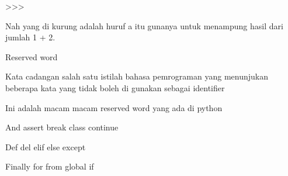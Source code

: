 \documentclass[a4paper,12pt]{report}
\begin{document}
\vspace{14pt}
\noindent 
{\fontsize{14pt}{14pt}\selectfont >>> \\} \par
\noindent 
{\fontsize{14pt}{14pt}\selectfont Nah yang di kurung adalah huruf a itu gunanya untuk menampung hasil dari jumlah 1 + 2.  \\} \par
\vspace{14pt}
\noindent 
{\fontsize{14pt}{14pt}\selectfont Reserved word  \\} \par
\vspace{14pt}
\noindent 
{\fontsize{14pt}{14pt}\selectfont Kata cadangan salah satu istilah bahasa pemrograman yang menunjukan beberapa kata yang tidak boleh di gunakan sebagai identifier \\} \par
\vspace{14pt}
\noindent 
{\fontsize{14pt}{14pt}\selectfont Ini adalah macam macam reserved word yang ada di python \\} \par
\vspace{14pt}
\noindent 
{\fontsize{14pt}{14pt}\selectfont And  \hspace*{0.5in}  \hspace*{0.5in} assert \hspace*{0.5in}  \hspace*{0.5in} break \hspace*{0.5in}  \hspace*{0.5in} class \hspace*{0.5in}  \hspace*{0.5in} continue \\} \par
\vspace{14pt}
\noindent 
{\fontsize{14pt}{14pt}\selectfont Def \hspace*{0.5in}  \hspace*{0.5in} del \hspace*{0.5in}  \hspace*{0.5in} elif \hspace*{0.5in}  \hspace*{0.5in} else \hspace*{0.5in}  \hspace*{0.5in} except \\} \par
\noindent 
{\fontsize{14pt}{14pt}\selectfont Finally \hspace*{0.5in} for \hspace*{0.5in}  \hspace*{0.5in} from  \hspace*{0.5in}  \hspace*{0.5in} global \hspace*{0.5in}  \hspace*{0.5in} if \\} \par
\end{document}

